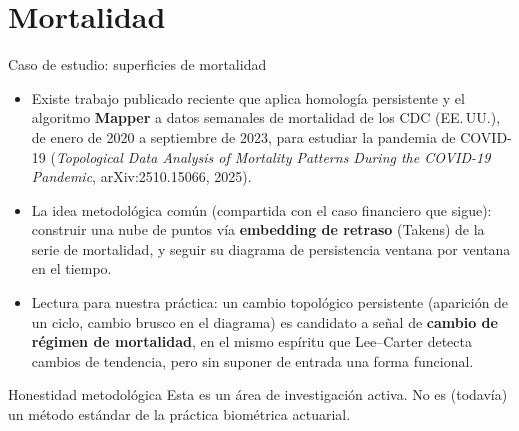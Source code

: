\documentclass[aspectratio=169,11pt]{beamer}
\newcommand{\defterm}[1]{\textbf{\color{accent}#1}}
\begin{document}
\section{Mortalidad}
\begin{frame}{Caso de estudio: superficies de mortalidad}
  \small
  \begin{itemize}
    \item Existe trabajo publicado reciente que aplica homología
      persistente y el algoritmo \defterm{Mapper} a datos semanales de
      mortalidad de los CDC (EE.\,UU.), de enero de 2020 a septiembre de
      2023, para estudiar la pandemia de COVID-19
      (\textit{Topological Data Analysis of Mortality Patterns During the
      COVID-19 Pandemic}, arXiv:2510.15066, 2025).
    \item La idea metodológica común (compartida con el caso financiero
      que sigue): construir una nube de puntos vía \defterm{embedding de
      retraso} (Takens) de la serie de mortalidad, y seguir su diagrama de
      persistencia ventana por ventana en el tiempo.
    \item Lectura para nuestra práctica: un cambio topológico persistente
      (aparición de un ciclo, cambio brusco en el diagrama) es candidato a
      señal de \textbf{cambio de régimen de mortalidad}, en el mismo
      espíritu que Lee--Carter detecta cambios de tendencia, pero sin
      suponer de entrada una forma funcional.
  \end{itemize}
  \vspace{0.3em}
  \begin{block}{Honestidad metodológica}
    Esta es un área de investigación activa. No es (todavía) un método
    estándar de la práctica biométrica actuarial.
  \end{block}
\end{frame}

\end{document}
